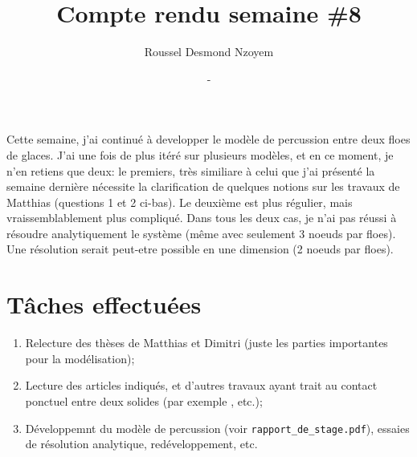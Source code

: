 \documentclass[
  french,
	11pt, %
]{fphw}
\title{Compte rendu semaine \#8} %
\author{Roussel Desmond Nzoyem} %
\date{\DTMdisplaydate{2021}{3}{24}{-1} - \DTMdisplaydate{2021}{3}{30}{-1}} %
\institute{Sorbonne Université \\ Laboratoire Jacques-Louis Lions} %
\begin{document}
\maketitle %



Cette semaine, j'ai continué à developper le modèle de percussion entre deux floes de glaces. J'ai une fois de plus itéré sur plusieurs modèles, et en ce moment, je n'en retiens que deux: le premiers, très similiare à celui que j'ai présenté la semaine dernière nécessite la clarification de quelques notions sur les travaux de Matthias (questions 1 et 2 ci-bas). Le deuxième est plus régulier, mais vraissemblablement plus compliqué. Dans tous les deux cas, je n'ai pas réussi à résoudre analytiquement le système (même avec seulement 3 noeuds par floes). Une résolution serait peut-etre possible en une dimension (2 noeuds par floes). 





\section*{Tâches effectuées}

\begin{enumerate}
  \item Relecture des thèses de Matthias et Dimitri \parencite{balasoiu2020halthesis,rabatel2015thesis} (juste les parties importantes pour la modélisation);
  \item Lecture des articles indiqués, et d'autres travaux ayant trait au contact ponctuel entre deux solides (par exemple \parencite{lotstedt1981coulomb}, etc.);
  \item Développemnt du modèle de percussion (voir \verb|rapport_de_stage.pdf|), essaies de résolution analytique, redéveloppement, etc. 
\end{enumerate}


\end{document}
